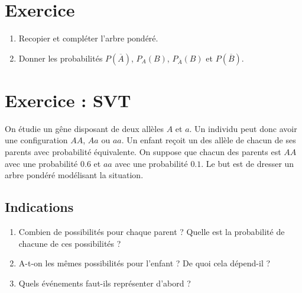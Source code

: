 \documentclass{article}
\begin{document}
\section{Exercice}
\begin{center}
\end{center}
\begin{enumerate}
\item Recopier et compléter l'arbre pondéré.
\item Donner les probabilités $P(\overline{A})$, $P_A(B)$, $P_{\overline{A}}(B)$ et $P(\overline{B})$.
\end{enumerate}
\section{Exercice : SVT}
On étudie un gêne disposant de deux allèles $A$ et $a$. Un individu peut donc avoir une configuration $AA$, $Aa$ ou $aa$. Un enfant reçoit un des allèle de chacun de ses parents avec probabilité équivalente. On suppose que chacun des parents est $AA$ avec une probabilité $0.6$ et $aa$ avec une probabilité $0.1$. Le but est de dresser un arbre pondéré modélisant la situation.
\subsection*{Indications}
\begin{enumerate}
\item Combien de possibilités pour chaque parent ? Quelle est la probabilité de chacune de ces possibilités ?
\item A-t-on les mêmes possibilités pour l'enfant ? De quoi cela dépend-il ?
\item Quels événements faut-ils représenter d'abord ?
\end{enumerate}
\end{document}
